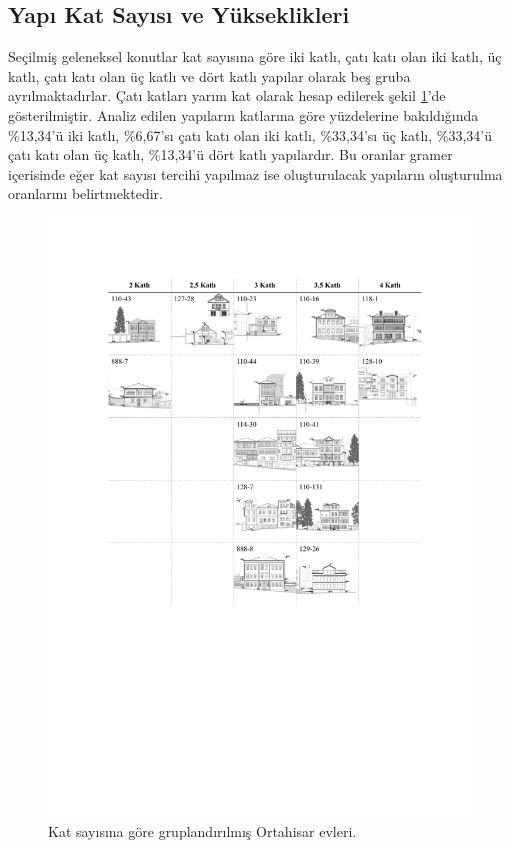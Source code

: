 \documentclass[12pt,turkish,a4paperpaper,]{report}
\begin{document}
\hypertarget{yapux131-kat-sayux131sux131-ve-yuxfckseklikleri}{%
\subsection{Yapı Kat Sayısı ve
Yükseklikleri}\label{yapux131-kat-sayux131sux131-ve-yuxfckseklikleri}}

Seçilmiş geleneksel konutlar kat sayısına göre iki katlı, çatı katı olan
iki katlı, üç katlı, çatı katı olan üç katlı ve dört katlı yapılar
olarak beş gruba ayrılmaktadırlar. Çatı katları yarım kat olarak hesap
edilerek şekil \ref{katgruplama}'de gösterilmiştir. Analiz edilen
yapıların katlarına göre yüzdelerine bakıldığında \%13,34'ü iki katlı,
\%6,67'sı çatı katı olan iki katlı, \%33,34'sı üç katlı, \%33,34'ü çatı
katı olan üç katlı, \%13,34'ü dört katlı yapılardır. Bu oranlar gramer
içerisinde eğer kat sayısı tercihi yapılmaz ise oluşturulacak yapıların
oluşturulma oranlarını belirtmektedir.

\begin{figure}
\centering
\includegraphics[width=1\textwidth,height=\textheight]{source/figures/katgruplandirma.pdf}
\caption{Kat sayısına göre gruplandırılmış Ortahisar evleri.
\label{katgruplama}}
\end{figure}
\end{document}
